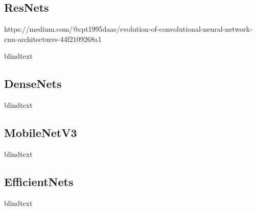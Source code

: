 \subsection{ResNets}

https://medium.com/@cpt1995daas/evolution-of-convolutional-neural-network-cnn-architectures-44f2109268a1

blindtext

\subsection{DenseNets}

blindtext

\subsection{MobileNetV3}

blindtext

\subsection{EfficientNets}

blindtext

